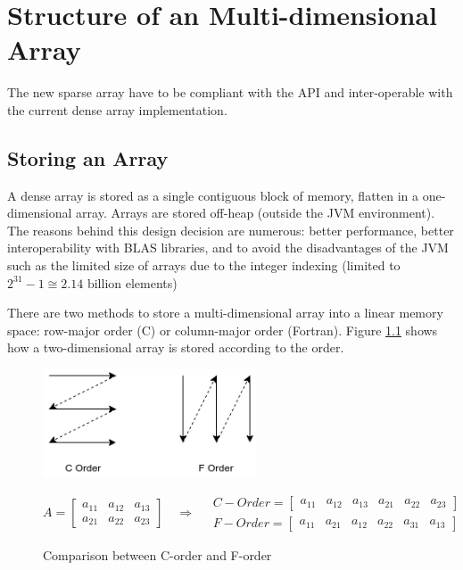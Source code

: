 \chapter{Structure of an Multi-dimensional Array}
The new sparse array have to be compliant with the API and inter-operable with the current dense array implementation.



\section{Storing an Array}

A dense array is stored as a single contiguous block of memory, flatten in a one-dimensional array. Arrays are stored off-heap (outside the JVM environment). The reasons behind this design decision are numerous: better performance, better interoperability with BLAS libraries, and to avoid the disadvantages of the {JVM} such as the limited size of arrays due to the integer indexing (limited to $2^{31}-1 \cong 2.14 \text{ billion}$ elements)

There are two methods to store a multi-dimensional array into a linear memory space: row-major order (C) or column-major order (Fortran). Figure \ref{fig:orders} shows how a two-dimensional array is stored according to the order.

\begin{figure}[h]
	\begin{center}
		\includegraphics[width=2.5in]{images/c_f_OrdersLabelled.png} 
		\label{fig:cOrders}
	\end{center}
	\[
	A = 
	\begin{bmatrix}
	a_{11} &  a_{12} & a_{13} \\
	a_{21} &  a_{22} & a_{23}
	\end{bmatrix}
	\quad\Rightarrow\quad
	\begin{aligned}
	C-Order = 
	\begin{bmatrix}
	a_{11} &  a_{12} & a_{13} & a_{21} &  a_{22} & a_{23}
	\end{bmatrix}
	\\
	F-Order = 
	\begin{bmatrix}
	a_{11} &  a_{21} & a_{12} & a_{22} &  a_{31} & a_{13}
	\end{bmatrix}
	\end{aligned}
	\]
\caption{Comparison between C-order and F-order}
\label{fig:orders}

\end{figure}

